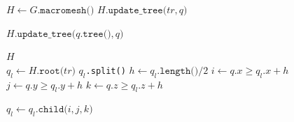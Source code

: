 \begin{algorithm}[htbp]
\caption{$H \gets \texttt{Reconstruct (}G\texttt{)}$} %
\begin{algorithmic}[1]
\State $H \gets G.\texttt{macromesh()}$
 
		\State $H.\texttt{update\_tree(} tr, q \texttt{)}$
	\EndFor
\EndFor

 
	\State $H.\texttt{update\_tree(} q.\texttt{tree()}, q \texttt{)}$
\EndFor

\State \Return $H$
\\
   
	\State $q_l \gets H.\texttt{root(}tr\texttt{)}$
		 $q_l$\texttt{.split()}
		\EndIf
		\State $h \gets q_l.\texttt{length()} / 2$ 
		\State $i \gets q.x \ge q_l.x + h$
		\State $j \gets q.y \ge q_l.y + h$
		\State $k \gets q.z \ge q_l.z + h$

		\State $q_l \gets q_l.\texttt{child(} i, j, k \texttt{)}$
	\EndWhile	
\EndFunction
\end{algorithmic}
\label{alg:reconstruction}
\end{algorithm}

